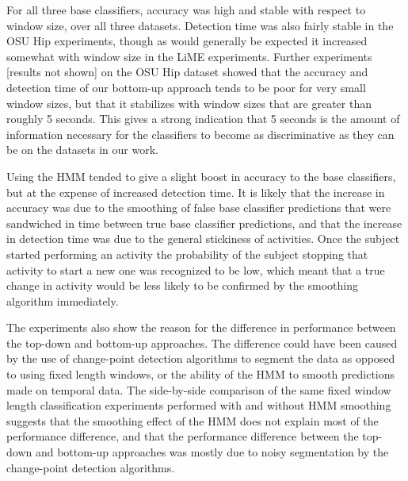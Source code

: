 For all three base classifiers, accuracy was high and
stable with respect to window size, over all three datasets. Detection
time was also fairly stable in the OSU Hip experiments, though as would
generally be expected it increased somewhat with window size in the LiME
experiments. Further experiments [results not shown] on the
OSU Hip dataset showed that the accuracy and detection time of our bottom-up approach 
tends to be poor for very small window sizes, but that it stabilizes with window sizes
that are greater than roughly 5 seconds. This gives a strong indication that
5 seconds is the amount of information necessary for the classifiers to become as
discriminative as they can be on the datasets in our work.

Using the HMM tended to give a slight boost in accuracy to the base classifiers,
but at the expense of increased detection time. It is likely that the increase
in accuracy was due to the smoothing of false base classifier predictions that
were sandwiched in time between true base classifier predictions, and that the increase in
detection time was due to the general stickiness of activities. Once the
subject started performing an activity the probability of the subject stopping
that activity to start a new one was recognized to be low, which meant that a true change in
activity would be less likely to be confirmed by the smoothing algorithm
immediately.

The experiments also show the reason for the difference in
performance between the top-down and bottom-up approaches. 
The difference could have been caused by the
use of change-point detection algorithms to segment the data as opposed to using
fixed length windows, or the ability of the HMM
to smooth predictions made on temporal data. The side-by-side comparison of the
same fixed window length classification experiments performed with and without HMM smoothing
suggests that the smoothing effect of the HMM
does not explain most of the performance difference, and that the performance difference between the top-down
and bottom-up approaches was mostly due to noisy segmentation by the change-point
detection algorithms.

